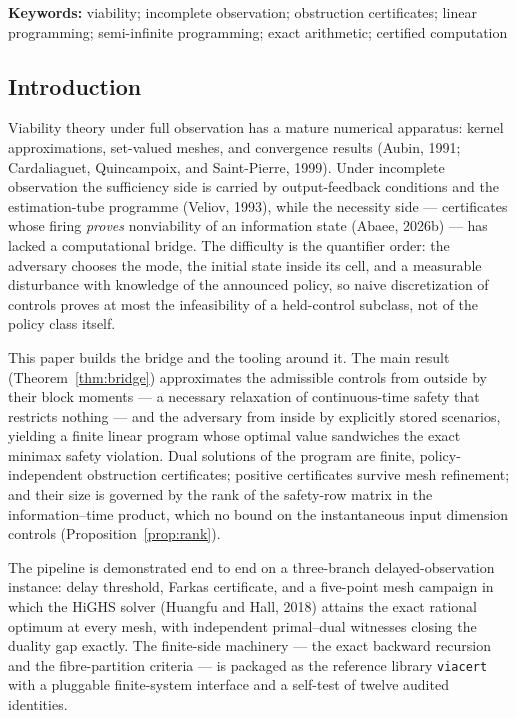 \documentclass[10pt,twocolumn]{article}
\theoremstyle{plain}
\theoremstyle{definition}
\theoremstyle{remark}
\begin{document}
\textbf{Keywords:} viability; incomplete observation; obstruction
certificates; linear programming; semi-infinite programming; exact
arithmetic; certified computation

\subsection{Introduction}\label{introduction}

Viability theory under full observation has a mature numerical apparatus:
kernel approximations, set-valued meshes, and convergence results
(Aubin, 1991; Cardaliaguet, Quincampoix, and Saint-Pierre, 1999). Under
incomplete observation the sufficiency side is carried by output-feedback
conditions and the estimation-tube programme (Veliov, 1993), while the
necessity side --- certificates whose firing \emph{proves} nonviability of an
information state (Abaee, 2026b) --- has lacked a computational bridge. The
difficulty is the quantifier order: the adversary chooses the mode, the
initial state inside its cell, and a measurable disturbance with knowledge of
the announced policy, so naive discretization of controls proves at most the
infeasibility of a held-control subclass, not of the policy class itself.

This paper builds the bridge and the tooling around it. The main result
(Theorem~\ref{thm:bridge}) approximates the admissible controls from outside
by their block moments --- a necessary relaxation of continuous-time safety
that restricts nothing --- and the adversary from inside by explicitly stored
scenarios, yielding a finite linear program whose optimal value sandwiches
the exact minimax safety violation. Dual solutions of the program are finite,
policy-independent obstruction certificates; positive certificates survive
mesh refinement; and their size is governed by the rank of the
safety-row matrix in the information--time product, which no bound on the
instantaneous input dimension controls (Proposition~\ref{prop:rank}).

The pipeline is demonstrated end to end on a three-branch
delayed-observation instance: delay threshold, Farkas certificate, and a
five-point mesh campaign in which the HiGHS solver (Huangfu and Hall, 2018)
attains the exact rational optimum at every mesh, with independent
primal--dual witnesses closing the duality gap exactly. The finite-side
machinery --- the exact backward recursion and the fibre-partition criteria
--- is packaged as the reference library \texttt{viacert} with a pluggable
finite-system interface and a self-test of twelve audited identities.
\end{document}
